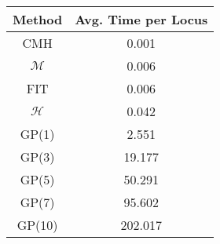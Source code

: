 \centering \begin{tabular}{c|c}
Method	&Avg. Time per Locus\\\hline
CMH	&0.001\\
$\mathcal{M}$	&0.006\\
FIT	&0.006\\
$\mathcal{H}$	&0.042\\
GP(1)	&2.551\\
GP(3)	&19.177\\
GP(5)	&50.291\\
GP(7)	&95.602\\
GP(10)	&202.017\\
\end{tabular}
